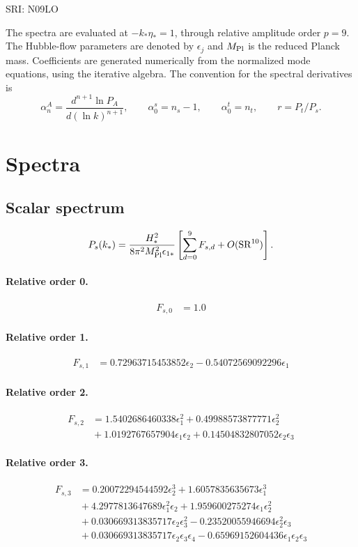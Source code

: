 \documentclass[10pt]{article}
\begin{document}
\begin{center}\Large SRI: N09LO\end{center}
The spectra are evaluated at $-k_*\eta_*=1$, through relative amplitude
order $p=9$. The Hubble-flow parameters are denoted by $\epsilon_j$
and $M_{\rm Pl}$ is the reduced Planck mass. Coefficients are generated
numerically from the normalized mode equations, using the iterative algebra.
The convention for the spectral derivatives is
\[
\alpha_n^A=\frac{d^{n+1}\ln P_A}{d(\ln k)^{n+1}},\qquad
\alpha_0^s=n_s-1,\qquad\alpha_0^t=n_t,\qquad r=P_t/P_s.
\]
\section{Spectra}

\subsection{Scalar spectrum}
\[P_s(k_*)=\frac{H_*^2}{8\pi^2M_{\rm Pl}^2\epsilon_{1*}}\left[\sum_{d=0}^{9}F_{s,d}+O(\mathrm{SR}^{10})\right].\]
\paragraph{Relative order 0.}
\begin{align*}
F_{s,0} &= 1.0
\end{align*}

\paragraph{Relative order 1.}
\begin{align*}
F_{s,1} &= 0.72963715453852 \epsilon_{2} - 0.54072569092296 \epsilon_{1}
\end{align*}

\paragraph{Relative order 2.}
\begin{align*}
F_{s,2} &= 1.5402686460338 \epsilon_{1}^{2} + 0.49988573877771 \epsilon_{2}^{2} \\
&{}  + 1.0192767657904 \epsilon_{1} \epsilon_{2} + 0.14504832807052 \epsilon_{2} \epsilon_{3}
\end{align*}

\paragraph{Relative order 3.}
\begin{align*}
F_{s,3} &= 0.20072294544592 \epsilon_{2}^{3} + 1.6057835635673 \epsilon_{1}^{3} \\
&{}  + 4.2977813647689 \epsilon_{1}^{2} \epsilon_{2} + 1.959600275274 \epsilon_{1} \epsilon_{2}^{2} \\
&{}  + 0.030669313835717 \epsilon_{2} \epsilon_{3}^{2} - 0.23520055946694 \epsilon_{2}^{2} \epsilon_{3} \\
&{}  + 0.030669313835717 \epsilon_{2} \epsilon_{3} \epsilon_{4} - 0.65969152604436 \epsilon_{1} \epsilon_{2} \epsilon_{3}
\end{align*}
\end{document}
